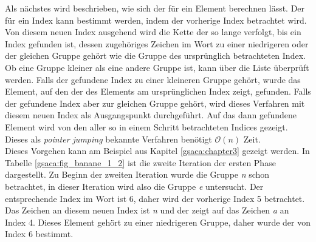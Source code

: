 Als nächstes wird beschrieben, wie sich der \prevpointer für ein Element berechnen lässt. 
Der \prevpointer für ein Index kann bestimmt werden, indem der vorherige Index betrachtet wird. 
Von diesem neuen Index ausgehend wird die Kette der \prevpointer so lange verfolgt, bis ein Index gefunden ist, dessen zugehöriges Zeichen im Wort zu einer niedrigeren oder der gleichen Gruppe gehört wie die Gruppe des ursprünglich betrachteten Index. 
Ob eine Gruppe kleiner als eine andere Gruppe ist, kann über die Liste \glink überprüft werden. 
Falls der gefundene Index zu einer kleineren Gruppe gehört, wurde das Element, auf den der \prevpointer des Elements am ursprünglichen Index zeigt, gefunden. 
Falls der gefundene Index aber zur gleichen Gruppe gehört, wird dieses Verfahren mit diesem neuen Index als Ausgangspunkt durchgeführt. 
Auf das dann gefundene Element wird von den \prevpointern aller so in einem Schritt betrachteten Indices gezeigt. 
Dieses als \textit{pointer jumping} bekannte Verfahren benötigt $\mathcal O(n)$ Zeit.\\
Dieses Vorgehen kann am Beispiel aus Kapitel \ref{gsaca:chapter3} gezeigt werden. 
In Tabelle \ref{gsaca:fig_banane_1_2} ist die zweite Iteration der ersten Phase dargestellt. 
Zu Beginn der zweiten Iteration wurde die Gruppe \textit{n} schon betrachtet, in dieser Iteration wird also die Gruppe \textit{e} untersucht. 
Der entsprechende Index im Wort ist 6, daher wird der vorherige Index 5 betrachtet. 
Das Zeichen an diesem neuen Index ist \textit{n} und der \prevpointer zeigt auf das Zeichen \textit{a} an Index 4. 
Dieses Element gehört zu einer niedrigeren Gruppe, daher wurde der \prevpointer von Index 6 bestimmt.\\

